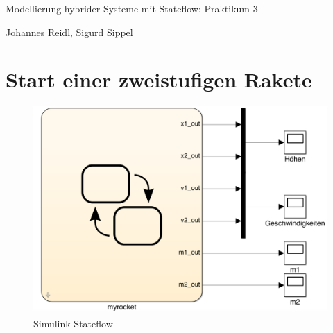 \documentclass[10pt,a4paper]{article}
\begin{document}
\begin{center}
Modellierung hybrider Systeme mit Stateflow: Praktikum 3

Johannes Reidl, Sigurd Sippel

\end{center}

\section{Start einer zweistufigen Rakete}

	\begin{figure}[H]
 	 		\centering
 	 		\includegraphics[width=1\textwidth]{../aufgabe1/screens/rocket_outer.png}
 	 		\caption{Simulink Stateflow}
 	 	\end{figure}
\end{document}
